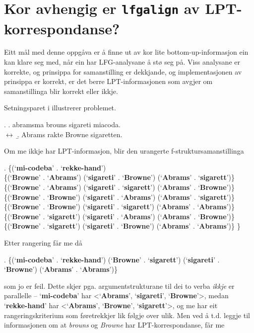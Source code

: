 \documentclass[11pt,a4paper,oneside,draft]{book}
\newcommand{\p}[1]{`\textbf{#1}'}
\begin{document}
 
\section{Kor avhengig er \texttt{lfgalign} av LPT-korrespondanse?}
\label{sec-5.2}

 Eitt mål med denne oppgåva er å finne ut av kor lite
 bottom-up-informasjon ein kan klare seg med, når ein har
 LFG-analysane å stø seg på. Viss analysane er korrekte, og prinsippa
 for samanstilling er dekkjande, og implementasjonen av prinsippa er
 korrekt, er det berre LPT-informasjonen som avgjer om samanstillinga
 blir korrekt eller ikkje.

 Setningsparet i \Next illustrerer problemet.

\ex. \a. abramsma brouns sigareti miacoda.\\
     $\leftrightarrow$
     \b. Abrams rakte Browne sigaretten.
     
 Om me ikkje har LPT-informasjon, blir den urangerte
 f-struktursamanstillinga

\ex. \{(\p{mi-codeba} . \p{rekke-hand}) \\
 \{(\p{Browne} . \p{Abrams}) (\p{sigareti} . \p{Browne}) (\p{Abrams} . \p{sigarett})\} \\
 \{(\p{Browne} . \p{Abrams}) (\p{sigareti} . \p{sigarett}) (\p{Abrams} . \p{Browne})\} \\
 \{(\p{Browne} . \p{Browne}) (\p{sigareti} . \p{Abrams}) (\p{Abrams} . \p{sigarett})\} \\
 \{(\p{Browne} . \p{Browne}) (\p{sigareti} . \p{sigarett}) (\p{Abrams} . \p{Abrams})\} \\
 \{(\p{Browne} . \p{sigarett}) (\p{sigareti} . \p{Abrams}) (\p{Abrams} . \p{Browne})\} \\
 \{(\p{Browne} . \p{sigarett}) (\p{sigareti} . \p{Browne}) (\p{Abrams} . \p{Abrams})\} \}

 Etter rangering får me då 

\ex. \{(\p{mi-codeba} . \p{rekke-hand}) (\p{Browne} . \p{sigarett}) (\p{sigareti} . \p{Browne}) (\p{Abrams} . \p{Abrams})\} 

 som jo er feil. Dette skjer pga. argumentstrukturane til dei to verba
 \emph{ikkje} er parallelle -- \p{mi-codeba} har <\p{Abrams}, \p{sigareti},
 \p{Browne}>, medan \p{rekke-hand} har <\p{Abrams}, \p{Browne},
 \p{sigarett}>, og me har eit rangeringskriterium som føretrekkjer lik
 følgje over ulik. Men ved å t.d. leggje til informasjonen om at \emph{brouns}
 og \emph{Browne} har LPT-korrespondanse, får me
\end{document}
